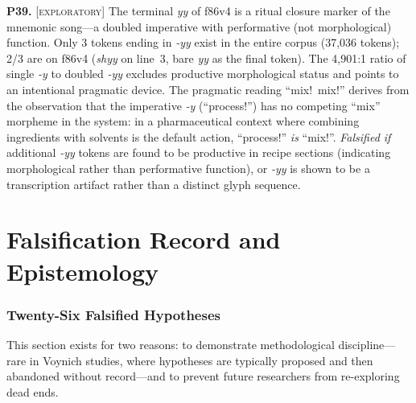 \documentclass[11pt,a4paper]{article}
\newcommand{\exploratory}{\textsc{[exploratory]}}
\newcommand{\falsmark}{\textit{Falsified if}}
\begin{document}
\noindent\textbf{P39.} \exploratory{} The terminal \textit{yy} of f86v4 is a ritual closure marker of the mnemonic song---a doubled imperative with performative (not morphological) function. Only 3 tokens ending in \textit{-yy} exist in the entire corpus (37,036 tokens); 2/3 are on f86v4 (\textit{shyy} on line~3, bare \textit{yy} as the final token). The 4,901:1 ratio of single \textit{-y} to doubled \textit{-yy} excludes productive morphological status and points to an intentional pragmatic device. The pragmatic reading ``mix!\ mix!'' derives from the observation that the imperative \textit{-y} (``process!'') has no competing ``mix'' morpheme in the system: in a pharmaceutical context where combining ingredients with solvents is the default action, ``process!'' \textit{is} ``mix!''. \falsmark{} additional \textit{-yy} tokens are found to be productive in recipe sections (indicating morphological rather than performative function), or \textit{-yy} is shown to be a transcription artifact rather than a distinct glyph sequence.

\part{Falsification Record and Epistemology}

\section{Twenty-Six Falsified Hypotheses}

This section exists for two reasons: to demonstrate methodological discipline---rare in Voynich studies, where hypotheses are typically proposed and then abandoned without record---and to prevent future researchers from re-exploring dead ends.
\end{document}
